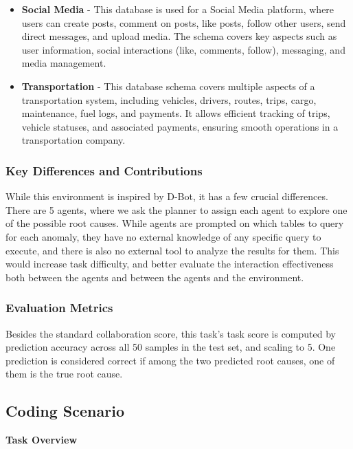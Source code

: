 \begin{itemize}
    and subscription details. It also tracks user activities and payments.
    \item \textbf{Social Media} - This database is used for a Social Media platform, where users can create
    posts, comment on posts, like posts, follow other users, send direct messages,
    and upload media. The schema covers key aspects such as user information, social
    interactions (like, comments, follow), messaging, and media management.
    \item \textbf{Transportation} - This database schema covers multiple aspects of a transportation system,
    including vehicles, drivers, routes, trips, cargo, maintenance, fuel logs, and
    payments. It allows efficient tracking of trips, vehicle statuses, and associated
    payments, ensuring smooth operations in a transportation company.
\end{itemize}

\subsubsection{Key Differences and Contributions}

While this environment is inspired by D-Bot, it has a few crucial differences. There are 5 agents, where we ask the planner to assign each agent to explore one of the possible root causes. While agents are prompted on which tables to query for each anomaly, they have no external knowledge of any specific query to execute, and there is also no external tool to analyze the results for them. This would increase task difficulty, and better evaluate the interaction effectiveness both between the agents and between the agents and the environment.

\subsubsection{Evaluation Metrics}

Besides the standard collaboration score, this task's task score is computed by prediction accuracy across all 50 samples in the test set, and scaling to 5. One prediction is considered correct if among the two predicted root causes, one of them is the true root cause.

\subsection{Coding Scenario}
\label{app:coding-scenario}

\textbf{Task Overview}

